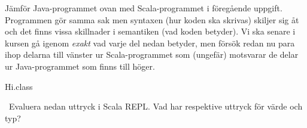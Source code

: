 \Subtask Jämför Java-programmet ovan med Scala-programmet i föregående uppgift. Programmen gör samma sak men syntaxen (hur koden ska skrivas) skiljer sig åt och det finns vissa skillnader i semantiken (vad koden betyder). Vi ska senare i kursen gå igenom \emph{exakt} vad varje del nedan betyder, men försök redan nu para ihop delarna till vänster ur Scala-programmet som (ungefär) motsvarar de delar ur Java-programmet som finns till höger.

\begin{ConceptConnections}

\end{ConceptConnections}

\SOLUTION


\TaskSolved \what


\SubtaskSolved  Hi.class

\SubtaskSolved

\begin{ConceptConnections}

\end{ConceptConnections}


\QUESTEND































\QUESTBEGIN

\Task  \what~Evaluera nedan uttryck i Scala REPL. Vad har respektive uttryck för värde och typ?

\Subtask {}

\Subtask {}

\Subtask {}

\Subtask {}

\Subtask {}

\Subtask {}

